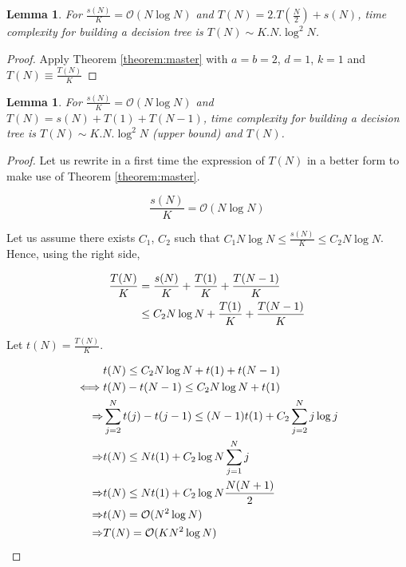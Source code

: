 \documentclass[english,11pt,openany]{article}
\theoremstyle{definition}
\newcommand{\bigO}{\mathcal{O}}
\theoremstyle{plain}
\newtheorem{Lemma}[Th]{Lemma}
\theoremstyle{definition}
\begin{document}
\begin{appendices}
		\vspace{0.5cm}
		\begin{Lemma}
			For $\frac{s(N)}{K} = \mathcal{O} (N\log N)$ and $T(N) = 2.T(\frac{N}{2}) + s(N)$, 
			time complexity for building a decision tree is $T(N) \sim K.N.\log^2N$.
		\end{Lemma}
		
		\begin{proof}
			Apply Theorem \ref{theorem:master} with $a=b=2$, $d=1$, $k=1$ and $T(N) \equiv \frac{T(N)}{K}$
		\end{proof}
		
		
		\begin{Lemma}
			For $\frac{s(N)}{K} = \mathcal{O} (N\log N)$ and $T(N) = s(N) + T(1) + T(N - 1) $, time complexity for building a decision tree is $T(N) \sim K.N.\log^2N$ (upper bound) and $T(N) $.
		\end{Lemma}
		
		\begin{proof}
			Let us rewrite in a first time the expression of $T(N)$ in a better form to make use of Theorem \ref{theorem:master}. 
			
			\begin{displaymath}
			\frac{s(N)}{K} = \mathcal{O} (N\log N)
			\end{displaymath}
			
			Let us assume there exists $C_1$, $C_2$ such that $C_1 N\log N \leq \frac{s(N)}{K} \leq C_2 N\log N$. 
			Hence, using the right side, 
			
			\begin{align}
			\frac{T(N)}{K}	& = \frac{s(N)}{K} + \frac{T(1)}{K} + \frac{T(N - 1)}{K} \notag \\
			& \leq C_2 N\log N + \frac{T(1)}{K} + \frac{T(N - 1)}{K}\notag
			\end{align}
			
			Let $t(N) = \frac{T(N)}{K}$. 
			
			\begin{align}
			& t(N) \leq C_2 N\log N + t(1) + t(N-1)\notag \\
			\iff &  t(N) - t(N-1) \leq C_2 N\log N + t(1) \notag\\
			\Rightarrow & \sum_{j=2}^{N}  t(j) - t(j-1) \leq (N-1)t(1) + C_2\sum_{j=2}^{N}j \log j \notag\\
			\Rightarrow & t(N) \leq Nt(1) + C_2\log N \sum_{j=1}^{N}j \notag\\
			\Rightarrow & t(N) \leq Nt(1) + C_2\log N \frac{N(N +1)}{2}\notag \\
			\Rightarrow & t(N) = \bigO (N^2 \log N) \notag \\
			\Rightarrow & T(N) = \bigO (KN^2 \log N) \notag
			\end{align}
			

\end{proof}
\end{appendices}
\end{document}
